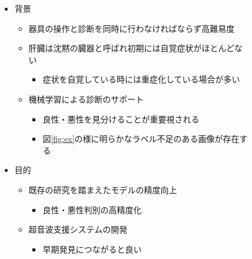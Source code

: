 \documentclass[a4j]{ujarticle}
\newcommand{\Fref}[1]{\mbox{図\ref{fig:#1}}}
\begin{document}
    \begin{figure}[h]
        \begin{minipage}{.59\textwidth}
            \begin{itemize}
                \item 背景
                \begin{itemize}
                    \item 器具の操作と診断を同時に行わなければならず高難易度
                    \item 肝臓は沈黙の臓器と呼ばれ初期には自覚症状がほとんどない
                    \begin{itemize}
                        \item 症状を自覚している時には重症化している場合が多い
                    \end{itemize}
                    \item 機械学習による診断のサポート
                    \begin{itemize}
                        \item 良性・悪性を見分けることが重要視される
                        \item \Fref{ex}の様に明らかなラベル不足\footnotemark[1]のある画像が存在する
                    \end{itemize}
                \end{itemize}
                \item 目的
                \begin{itemize}
                    \item 既存の研究を踏まえたモデルの精度向上
                    \begin{itemize}
                        \item 良性・悪性判別の高精度化
                    \end{itemize}
                    \item 超音波支援システムの開発
                    \begin{itemize}
                        \item 早期発見につながると良い
                    \end{itemize}
                \end{itemize}
            \end{itemize}
        \end{minipage}
        \begin{minipage}{.39\textwidth}
            \centering

\end{minipage}
\end{figure}
\end{document}
